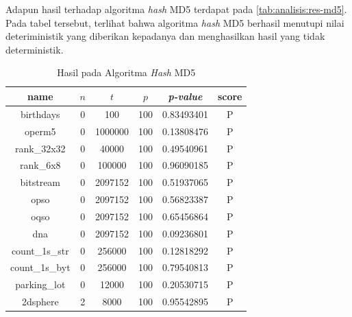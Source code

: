 \documentclass[conference]{IEEEtran}
\newcommand{\en}[1]
    {\foreignlanguage{english}{\textit{#1}}}
\begin{document}
Adapun hasil  terhadap algoritma \en{hash} MD5 terdapat pada \autoref{tab:analisis:res-md5}.
Pada tabel tersebut, terlihat bahwa algoritma \en{hash} MD5 berhasil menutupi nilai deteriministik yang diberikan kepadanya dan menghasilkan hasil yang tidak deterministik.

\begin{table}[htbp]
    \caption{Hasil  pada Algoritma \en{Hash} MD5}
    \label{tab:analisis:res-md5}
    \begin{center}
        \begin{tabular}{|c|c|c|c|c|c|}
            \hline
            \textbf{name}  & \textbf{$n$} & \textbf{$t$} & \textbf{$p$} & \textbf{\en{p-value}} & \textbf{score} \\
            \hline
            birthdays      & 0            & 100          & 100          & 0.83493401            & P              \\
            operm5         & 0            & 1000000      & 100          & 0.13808476            & P              \\
            rank\_32x32    & 0            & 40000        & 100          & 0.49540961            & P              \\
            rank\_6x8      & 0            & 100000       & 100          & 0.96090185            & P              \\
            bitstream      & 0            & 2097152      & 100          & 0.51937065            & P              \\
            opso           & 0            & 2097152      & 100          & 0.56823387            & P              \\
            oqso           & 0            & 2097152      & 100          & 0.65456864            & P              \\
            dna            & 0            & 2097152      & 100          & 0.09236801            & P              \\
            count\_1s\_str & 0            & 256000       & 100          & 0.12818292            & P              \\
            count\_1s\_byt & 0            & 256000       & 100          & 0.79540813            & P              \\
            parking\_lot   & 0            & 12000        & 100          & 0.20530715            & P              \\
            2dsphere       & 2            & 8000         & 100          & 0.95542895            & P              \\

\end{tabular}
\end{center}
\end{table}
\end{document}
